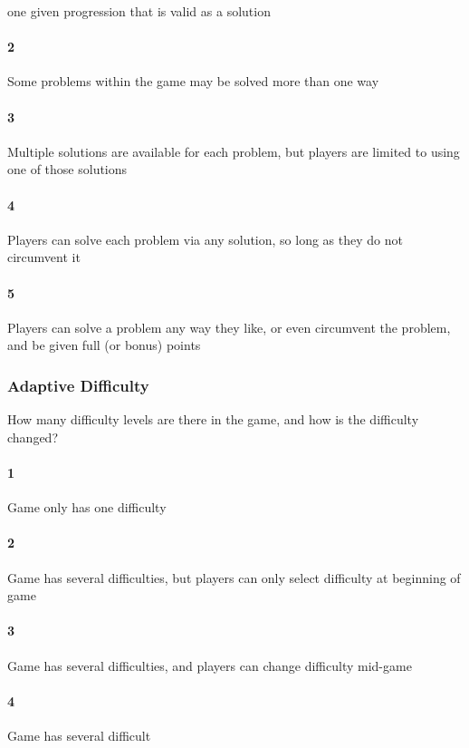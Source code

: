 one given progression that is valid as a solution\paragraph{2}Some problems within the game may be solved more than one way\paragraph{3}Multiple solutions are available for each problem, but players are limited to using one of those solutions\paragraph{4}Players can solve each problem via any solution, so long as they do not circumvent it\paragraph{5}Players can solve a problem any way they like, or even circumvent the problem, and be given full (or bonus) points\subsubsection{Adaptive Difficulty}How many difficulty levels are there in the game, and how is the difficulty changed?\paragraph{1}Game only has one difficulty\paragraph{2}Game has several difficulties, but players can only select difficulty at beginning of game\paragraph{3}Game has several difficulties, and players can change difficulty mid-game\paragraph{4}Game has several difficult